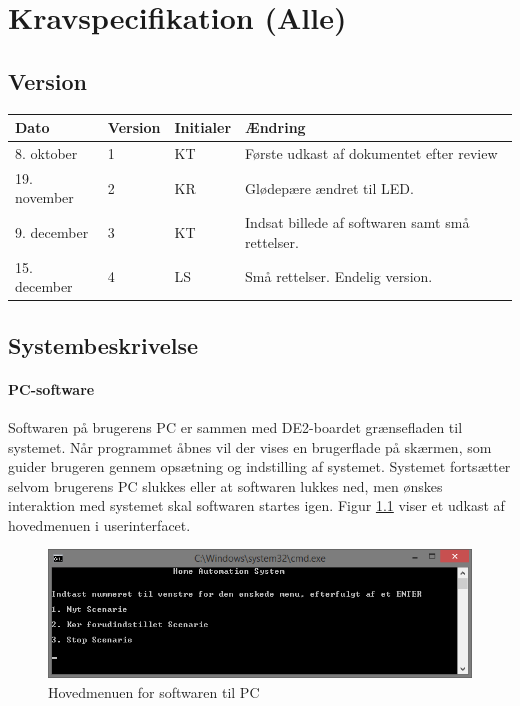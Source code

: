 \chapter{Kravspecifikation (Alle)}\label{chap:kravspec}

\section{Version}
\begin{table}[h]
	\centering
	\begin{tabularx}{\textwidth - 2cm}{|l|l| l|X|}
	\hline
	Dato	& Version	& Initialer & Ændring	\\ \hline
	8. oktober & 1 & KT	& Første udkast af dokumentet efter review \\ \hline
	19. november & 2 & KR & Glødepære ændret til LED. \\ \hline
	9. december & 3 & KT & Indsat billede af softwaren samt små rettelser. \\ \hline
	15. december & 4 & LS & Små rettelser. Endelig version. \\ \hline
	\end{tabularx}
\end{table}

\section{Systembeskrivelse} \label{Systembeskrivelse}
\subsubsection{PC-software}
Softwaren på brugerens PC er sammen med DE2-boardet grænsefladen til systemet. Når programmet åbnes vil der vises en brugerflade på skærmen, som guider brugeren gennem opsætning og indstilling af systemet. Systemet fortsætter selvom brugerens PC slukkes eller at softwaren lukkes ned, men ønskes interaktion med systemet skal softwaren startes igen. Figur \ref{fig:softwareudkast} viser et udkast af hovedmenuen i userinterfacet.

\begin{figure}[h]
\centering
\includegraphics[width=\textwidth - 2.5 cm, clip=true, trim=4 16 50 22]{../Kravspecifikation/swudkast}
\caption{Hovedmenuen for softwaren til PC}
\label{fig:softwareudkast}
\end{figure}

